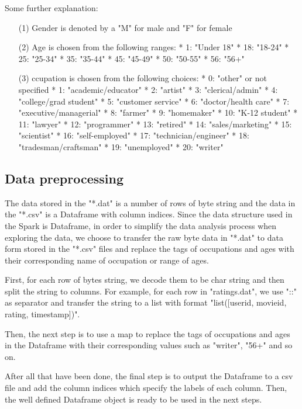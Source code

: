 \documentclass[two column]{article}
\begin{document}
\begin{itemize}
\par Some further explanation:
\begin{itemize}
\item[(1)] Gender is denoted by a "M" for male and "F" for female
\item[(2)] Age is chosen from the following ranges: 
	*  1:  "Under 18"
	* 18:  "18-24"
	* 25:  "25-34"
	* 35:  "35-44"
	* 45:  "45-49"
	* 50:  "50-55"
	* 56:  "56+"
\item[(3)] ccupation is chosen from the following choices:
	*  0:  "other" or not specified
	*  1:  "academic/educator"
	*  2:  "artist"
	*  3:  "clerical/admin"
	*  4:  "college/grad student"
	*  5:  "customer service"
	*  6:  "doctor/health care"
	*  7:  "executive/managerial"
	*  8:  "farmer"
	*  9:  "homemaker"
	* 10:  "K-12 student"
	* 11:  "lawyer"
	* 12:  "programmer"
	* 13:  "retired"
	* 14:  "sales/marketing"
	* 15:  "scientist"
	* 16:  "self-employed"
	* 17:  "technician/engineer"
	* 18:  "tradesman/craftsman"
	* 19:  "unemployed"
	* 20:  "writer"
\end{itemize}

\end{itemize}

\subsection{Data preprocessing}
\par The data stored in the "*.dat" is a number of rows of byte string and the data in the "*.csv" is a Dataframe with column indices. Since the data structure used in the Spark is Dataframe, in order to simplify the data analysis process when exploring the data, we choose to transfer the raw byte data in "*.dat" to data form stored in the "*.csv" files and replace the tags of occupations and ages with their corresponding name of occupation or range of ages.
\par First, for each row of bytes string, we decode them to be char string and then split the string to columns. For example, for each row in "ratings.dat", we use "::" as separator and transfer the string to a list with format "list([userid, movieid, rating, timestamp])".
\par Then, the next step is to use a map to replace the tags of occupations and ages in the Dataframe with their corresponding values such as "writer", "56+" and so on.
\par After all that have been done, the final step is to output the Dataframe to a csv file and add the column indices which specify the labels of each column. Then, the well defined Dataframe object is ready to be used in the next steps.
\end{document}
